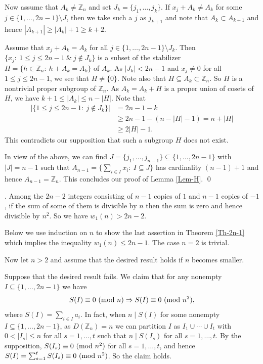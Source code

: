 \documentclass[11pt,reqno]{amsart}
\def\pmod #1{\ ({\rm{mod}}\ #1)}
\def\Z{\mathbb Z}
\def\ls{\leqslant}
\def\gs{\geqslant}
\def\se {\subseteq}
\def\sm{\setminus}
\def\eq{\equiv}
\theoremstyle{plain}
\theoremstyle{definition}
\theoremstyle{remark}
\begin{document}
Now assume that
$A_k\not=\Z_n$ and set $J_k=\{j_1,\ldots,j_k\}$.
If $x_j+A_k\not=A_k$ for some $j\in\{1,\ldots,2n-1\}\sm J$, then we take such a $j$
as $j_{k+1}$ and note that $A_k\subset A_{k+1}$ and hence $|A_{k+1}|\gs |A_k|+1\gs k+2$.

Assume that $x_j+A_k=A_k$ for all $j\in\{1,\ldots,2n-1\}\sm J_k$.
Then $\{x_j:\ 1\ls j\ls 2n-1\ \&\ j\not\in J_k\}$ is a subset of the stabilizer
$H=\{h\in\Z_n:\ h+A_k=A_k\}$ of $A_k$. As $|J_k|<2n-1$ and $x_j\not=0$ for all $1\ls j\ls2n-1$,
we see that $H\not=\{0\}$. Note also that $H\se A_k\subset \Z_n$.
So $H$ is a nontrivial proper subgroup of $\Z_n$. As $A_k=A_k+H$
is a proper union of cosets of $H$, we have $k+1\ls|A_k|\ls n-|H|$.
Note that
\begin{align*}|\{1\ls j\ls 2n-1:\ j\not\in J_k\}|&=2n-1-k
\\&\gs 2n-1-(n-|H|-1)=n+|H|
\\&\gs 2|H|-1.
\end{align*}
This contradicts our supposition that such a subgroup $H$ does not exist.

In view of the above, we can find $J=\{j_1,\ldots,j_{n-1}\}\se\{1,\ldots,2n-1\}$ with $|J|=n-1$
such that $A_{n-1}=\{\sum_{i\in I}x_i:\ I\se J\}$ has cardinality $(n-1)+1$ and hence $A_{n-1}=\Z_n$.
This concludes our proof of Lemma \ref{Lem-H}. \qed



\medskip
{}. Among the $2n-2$ integers consisting of $n-1$ copies of $1$ and $n-1$ copies of $-1$, if the sum of some of them is divisible by $n$ then the sum is zero and hence divisible by $n^2$. So we have $w_1(n)>2n-2$.

Below we use induction on $n$ to show the last assertion in Theorem \ref{Th-2n-1}
which implies the inequality $w_1(n)\ls 2n-1$. The case $n=2$ is trivial.

Now let $n>2$ and assume that the desired result holds if $n$ becomes smaller.

Suppose that the desired result fails. We claim that for any nonempty $I\se\{1,\ldots,2n-1\}$  we have
$$S(I)\eq0\pmod n \Rightarrow S(I)\eq0\pmod{n^2},$$
where $S(I)=\sum_{i\in I}a_i$. In fact, when $n\mid S(I)$ for some nonempty $I\se\{1,\ldots,2n-1\}$,
as $D(\Z_n)=n$ we can partition $I$ as $I_1\cup \cdots\cup I_t$ with $0<|I_s|\ls n$ for all $s=1,\ldots,t$
such that $n\mid S(I_s)$ for all $s=1,\ldots,t$.
By the supposition, $S(I_s)\eq 0\pmod{n^2}$ for all $s=1,\ldots,t$, and hence
$S(I)=\sum_{s=1}^tS(I_s)\eq0\pmod{n^2}$. So the claim holds.
\end{document}
